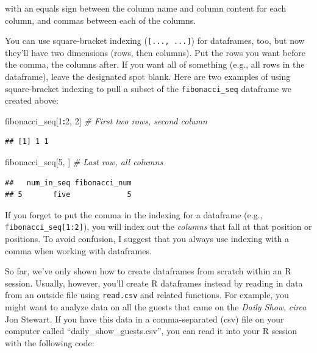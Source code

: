 \documentclass[]{book}
\makeatletter
\newenvironment{Shaded}{\begin{snugshade}}{\end{snugshade}}
\newcommand{\DecValTok}[1]{\textcolor[rgb]{0.00,0.00,0.81}{#1}}
\newcommand{\CommentTok}[1]{\textcolor[rgb]{0.56,0.35,0.01}{\textit{#1}}}
\newcommand{\OperatorTok}[1]{\textcolor[rgb]{0.81,0.36,0.00}{\textbf{#1}}}
\newcommand{\NormalTok}[1]{#1}
\newenvironment{kframe}{%
\medskip{}
\setlength{\fboxsep}{.8em}
 \def\at@end@of@kframe{}%
 \ifinner\ifhmode%
  \def\at@end@of@kframe{\end{minipage}}%
  \begin{minipage}{\columnwidth}%
 \fi\fi%
 \def\FrameCommand##1{\hskip\@totalleftmargin \hskip-\fboxsep
 \colorbox{shadecolor}{##1}\hskip-\fboxsep
     \hskip-\linewidth \hskip-\@totalleftmargin \hskip\columnwidth}%
 \MakeFramed {\advance\hsize-\width
   \@totalleftmargin\z@ \linewidth\hsize
   \@setminipage}}%
 {\par\unskip\endMakeFramed%
 \at@end@of@kframe}
\renewenvironment{Shaded}{\begin{kframe}}{\end{kframe}}
\newenvironment{rmdblock}[1]
  {
  \begin{itemize}
  \renewcommand{\labelitemi}{
    \raisebox{-.7\height}[0pt][0pt]{
      {\setkeys{Gin}{width=3em,keepaspectratio}\texttt{[image: images/\#1]}}
    }
  }
  \setlength{\fboxsep}{1em}
  \begin{kframe}
  \item
  }
  {
  \end{kframe}
  \end{itemize}
  }
\newenvironment{rmdnote}
  {\begin{rmdblock}{note}}
  {\end{rmdblock}}
\theoremstyle{definition}
\theoremstyle{definition}
\theoremstyle{definition}
\theoremstyle{remark}
\makeatother
\begin{document}
with an equals sign between the column name and column content for each
column, and commas between each of the columns.

You can use square-bracket indexing (\texttt{{[}...,\ ...{]}}) for
dataframes, too, but now they'll have two dimensions (rows, then
columns). Put the rows you want before the comma, the columns after. If
you want all of something (e.g., all rows in the dataframe), leave the
designated spot blank. Here are two examples of using square-bracket
indexing to pull a subset of the \texttt{fibonacci\_seq} dataframe we
created above:

\begin{Shaded}
\begin{Highlighting}[]
\NormalTok{fibonacci_seq[}\DecValTok{1}\OperatorTok{:}\DecValTok{2}\NormalTok{, }\DecValTok{2}\NormalTok{] }\CommentTok{# First two rows, second column}
\end{Highlighting}
\end{Shaded}

\begin{verbatim}
## [1] 1 1
\end{verbatim}

\begin{Shaded}
\begin{Highlighting}[]
\NormalTok{fibonacci_seq[}\DecValTok{5}\NormalTok{, ] }\CommentTok{# Last row, all columns}
\end{Highlighting}
\end{Shaded}

\begin{verbatim}
##   num_in_seq fibonacci_num
## 5       five             5
\end{verbatim}

\begin{rmdnote}
If you forget to put the comma in the indexing for a dataframe (e.g.,
\texttt{fibonacci\_seq{[}1:2{]}}), you will index out the \emph{columns}
that fall at that position or positions. To avoid confusion, I suggest
that you always use indexing with a comma when working with dataframes.
\end{rmdnote}

So far, we've only shown how to create dataframes from scratch within an
R session. Usually, however, you'll create R dataframes instead by
reading in data from an outside file using \texttt{read.csv} and related
functions. For example, you might want to analyze data on all the guests
that came on the \emph{Daily Show}, \emph{circa} Jon Stewart. If you
have this data in a comma-separated (csv) file on your computer called
``daily\_show\_guests.csv'', you can read it into your R session with
the following code:
\end{document}
